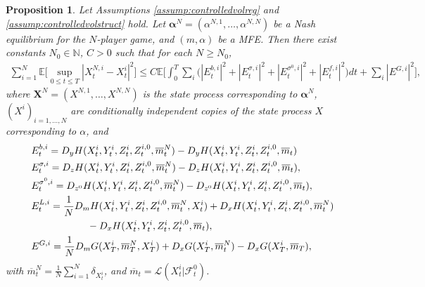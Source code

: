 \documentclass[11pt,reqno]{amsart}
\numberwithin{equation}{section}
\newtheorem{proposition}[theorem]{Proposition}
\theoremstyle{definition}
\def\E{{\mathbb E}}
\def\N{{\mathbb N}}
\newcommand{\bX}{\mathbf{X}}
\newcommand{\sL}{\mathcal{L}}
\newcommand{\sF}{\mathcal{F}}
\newcommand{\ov}{\overline}
\def \E{\mathbb{E}}
\def \N{\mathbb{N}}
\begin{document}
\begin{proposition} 
\label{prop:mainest}
Let Assumptions \ref{assump:controlledvolreg} and \ref{assump:controlledvolstruct} hold. Let $\bm \alpha^N = (\alpha^{N,1},\dots,\alpha^{N,N})$ be a Nash equilibrium for the $N$-player game, and $(m,\alpha)$ be a MFE. Then there exist constants $N_0 \in \N$, $C  > 0$ such that for each $N \geq N_0$,
\begin{align*}
\sum_{ i = 1}^N \E\Big[\sup_{0 \leq t \leq T} |X^{N,i}_t - X^i_t|^2 \Big] \leq C \E \bigg[ \int_0^T  \sum_i \Big(|E_t^{b,i}|^2 + |E_t^{\sigma,i}|^2 + |E_t^{\sigma^0,i}|^2  + |E_t^{f,i}|^2 \Big) dt  +  \sum_i |E^{G,i}|^2 \bigg], 
\end{align*}
where 
$\bX^N = (X^{N,1},\dots,X^{N,N})$ is the state process corresponding to $\bm \alpha^N$, $(X^i)_{i = 1,\dots,N}$ are conditionally independent copies of the state process $X$ corresponding to $\alpha$, and
\begin{align*}
  &E_t^{b,i} = D_y H(X_t^i, Y_t^i, Z_t^i, Z_t^{i,0}, \ov{m}_t^N) - D_y H(X_t^i, Y_t^i, Z_t^i, Z_t^{i,0}, \ov{m}_t)
  \\
  &E_t^{\sigma,i} = D_z H(X_t^i, Y_t^i, Z_t^i, Z_t^{i,0}, \ov{m}_t^N) - D_z H(X_t^i, Y_t^i, Z_t^i, Z_t^{i,0}, \ov{m}_t), 
  \\
  &E_t^{\sigma^0,i} = D_{z^0} H(X_t^i, Y_t^i, Z_t^i, Z_t^{i,0}, \ov{m}_t^N) - D_{z^0} H(X_t^i, Y_t^i, Z_t^i, Z_t^{i,0}, \ov{m}_t), 
  \\
  &E_t^{L,i} = \frac{1}{N} D_m H(X_t^{i}, Y_t^{i}, Z_t^{i}, Z_t^{i,0}, \ov{m}_t^N, X_t^{i})
  + D_x H(X_t^i, Y_t^i, Z_t^i, Z_t^{i,0}, \ov{m}_t^N) \\
  & \hspace{2cm}  - D_x H(X_t^i, Y_t^i, Z_t^i, Z_t^{i,0}, \ov{m}_t), \\
  \vspace{.1cm}
  &E^{G,i} = \frac{1}{N} D_m G(X_T^{i}, \ov{m}_T^N, X_T^i) + D_x G(X_T^{i}, \ov{m}_t^N) - D_x G(X_T^i, \ov{m}_T), 
\end{align*}
with $\ov{m}_t^N = \frac1N\sum_{i = 1}^{N} \delta_{X_t^i}$, and $\ov{m}_t = \sL(X_t^i | \sF_t^0)$.



\end{proposition}
\end{document}
